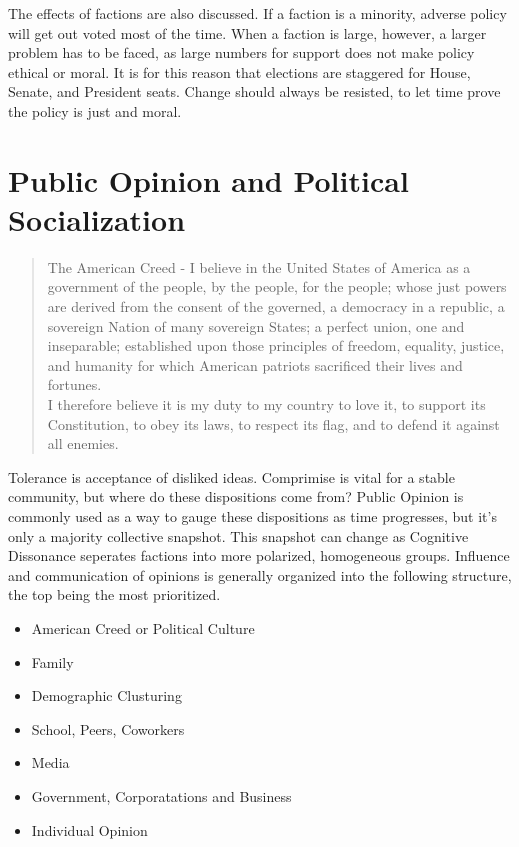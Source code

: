 \documentclass{article}
\begin{document}
The effects of factions are also discussed. If a faction is a minority, adverse policy will get out voted most of the time. When a faction is large, however, a larger problem has to be faced, as large numbers for support does not make policy ethical or moral. It is for this reason that elections are staggered for House, Senate, and President seats. Change should always be resisted, to let time prove the policy is just and moral.

\section{Public Opinion and Political Socialization}
\begin{quote}
  The American Creed - I believe in the United States of America as a government of the people, by the people, for the people; whose just powers are derived from the consent of the governed, a democracy in a republic, a sovereign Nation of many sovereign States; a perfect union, one and inseparable; established upon those principles of freedom, equality, justice, and humanity for which American patriots sacrificed their lives and fortunes.\\ I therefore believe it is my duty to my country to love it, to support its Constitution, to obey its laws, to respect its flag, and to defend it against all enemies.
\end{quote}

Tolerance is acceptance of disliked ideas. Comprimise is vital for a stable community, but where do these dispositions come from? Public Opinion is commonly used as a way to gauge these dispositions as time progresses, but it's only a majority collective snapshot. This snapshot can change as Cognitive Dissonance seperates factions into more polarized, homogeneous groups. Influence and communication of opinions is generally organized into the following structure, the top being the most prioritized.

\begin{itemize}
  \item American Creed or Political Culture
  \item Family
  \item Demographic Clusturing
  \item School, Peers, Coworkers
  \item Media
  \item Government, Corporatations and Business
  \item Individual Opinion
\end{itemize}
\end{document}
